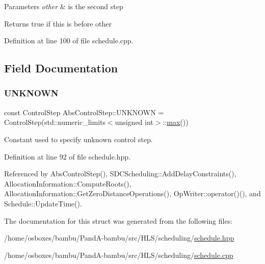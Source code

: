\begin{DoxyParams}{Parameters}
{\em other} & is the second step \\
\hline
\end{DoxyParams}
\begin{DoxyReturn}{Returns}
true if this is before other 
\end{DoxyReturn}


Definition at line 100 of file schedule.\+cpp.



\subsection{Field Documentation}
\mbox{\label{structAbsControlStep_a69f07dd88767800287378631f3fd18bf}} 
\subsubsection{\texorpdfstring{U\+N\+K\+N\+O\+WN}{UNKNOWN}}
{\footnotesize\ttfamily const Control\+Step Abs\+Control\+Step\+::\+U\+N\+K\+N\+O\+WN = Control\+Step(std\+::numeric\+\_\+limits$<$unsigned int$>$\+::\hyperlink{tutorial__pact__2019_2Target-Customization_2first_2hint_8c_a28f422940797ea297699ba55d89171c5}{max}())\hspace{0.3cm}{\ttfamily [static]}}



Constant used to specify unknown control step. 



Definition at line 92 of file schedule.\+hpp.



Referenced by Abs\+Control\+Step(), S\+D\+C\+Scheduling\+::\+Add\+Delay\+Constraints(), Allocation\+Information\+::\+Compute\+Roots(), Allocation\+Information\+::\+Get\+Zero\+Distance\+Operations(), Op\+Writer\+::operator()(), and Schedule\+::\+Update\+Time().



The documentation for this struct was generated from the following files\+:\begin{DoxyCompactItemize}
\item 
/home/osboxes/bambu/\+Pand\+A-\/bambu/src/\+H\+L\+S/scheduling/\hyperlink{schedule_8hpp}{schedule.\+hpp}\item 
/home/osboxes/bambu/\+Pand\+A-\/bambu/src/\+H\+L\+S/scheduling/\hyperlink{schedule_8cpp}{schedule.\+cpp}\end{DoxyCompactItemize}
